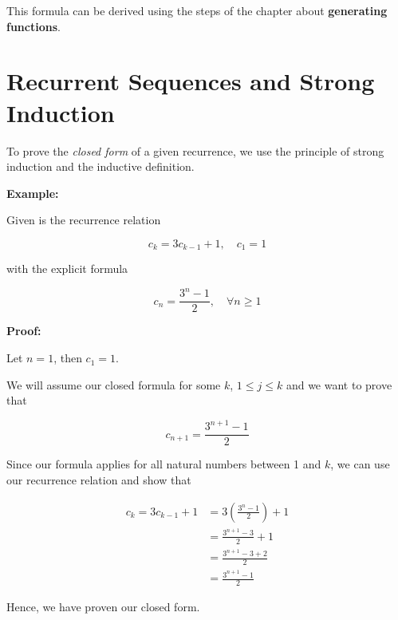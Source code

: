 This formula can be derived using the steps of the chapter about \textbf{generating functions}.

\section{Recurrent Sequences and Strong Induction}

To prove the \emph{closed form} of a given recurrence, we use the principle of strong induction and the inductive definition.

\textbf{Example:}

Given is the recurrence relation 

\[
    c_k = 3c_{k - 1} + 1, \quad c_1 = 1
\]

with the explicit formula 

\[
    c_n = \frac{3^n - 1}{2}, \quad \forall n \ge 1
\]

\textbf{Proof:}

Let \(n = 1\), then \(c_1 = 1\).

We will assume our closed formula for some \(k\), \(1 \le j \le k\) and we want to prove that 

\[
    c_{n + 1} = \frac{3^{n + 1} - 1}{2}
\]

Since our formula applies for all natural numbers between 1 and \(k\), we can use our recurrence relation and show that 

\begin{align*}
    c_k = 3c_{k - 1} + 1 &= 3 \left(\frac{3^n - 1}{2}\right) + 1 \\ 
    &= \frac{3^{n + 1} - 3}{2} + 1 \\ 
    &= \frac{3^{n + 1} - 3 + 2}{2} \\ 
    &= \frac{3^{n + 1} - 1}{2}
\end{align*}

Hence, we have proven our closed form.

\QED